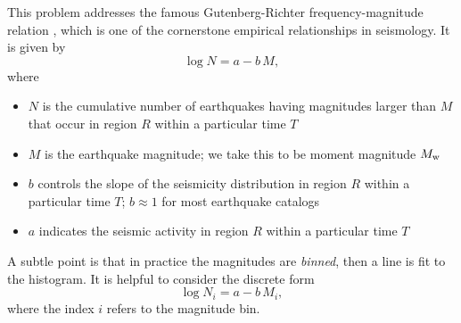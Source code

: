 \documentclass[11pt,titlepage,fleqn]{article}
\begin{document}
This problem addresses the famous Gutenberg-Richter frequency-magnitude relation \citep{GutenbergRichter1944}, which is one of the cornerstone empirical relationships in seismology. It is given by
%
\begin{equation}
\log N = a - b\,M,
\label{GR}
\end{equation}
%
where
%
\begin{itemize}
\item $N$ is the cumulative number of earthquakes having magnitudes larger than $M$ that occur in region $R$ within a particular time $T$
\item $M$ is the earthquake magnitude; we take this to be moment magnitude $M_{\rm w}$
\item $b$ controls the slope of the seismicity distribution in region $R$ within a particular time $T$; $b \approx 1$ for most earthquake catalogs
\item $a$ indicates the seismic activity in region $R$ within a particular time $T$
\end{itemize}
%
A subtle point is that in practice the magnitudes are {\em binned}, then a line is fit to the histogram. It is helpful to consider the discrete form
%
\begin{equation}
\log N_i = a - b\,M_i,
\label{GRd}
\end{equation}
%
where the index $i$ refers to the magnitude bin.

\pagebreak

\end{document}
